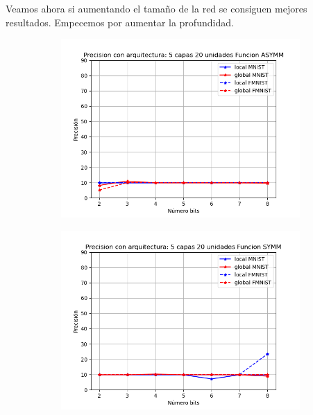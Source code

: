 Veamos ahora si aumentando el tamaño de la red se consiguen mejores resultados. Empecemos por aumentar la profundidad.

\begin{figure}[H]
    \centering
    \begin{subfigure}[H]{0.475\textwidth}
    \includegraphics[width=\textwidth]{imagenes/dni/Precision con arquitectura: 5 capas 20 unidades Funcion ASYMM.png}
    \end{subfigure}
    \begin{subfigure}[H]{0.475\textwidth}
    \includegraphics[width=\textwidth]{imagenes/dni/Precision con arquitectura: 5 capas 20 unidades Funcion SYMM.png}
    \end{subfigure}
\end{figure}

